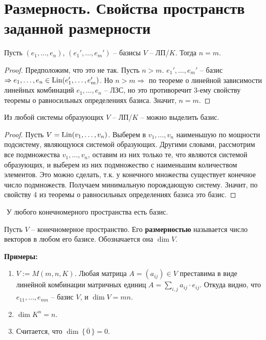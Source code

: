 
\section{Размерность. Свойства пространств заданной размерности}

\begin{theorem-non}
\end{theorem-non}
Пусть $(e_1, \dots, e_n)$, $(e_1', \dots, e_m')$ -- базисы $V$ -- ЛП/$K$.
Тогда $n = m$.
\begin{proof}
    Предположим, что это не так. Пусть $n > m$. $e_1', \dots, e_m'$ --
    базис $\Rightarrow e_1, \dots, e_n \in \operatorname{Lin}(e_1', \dots, e_m')$.
    Но $n > m \Rightarrow$ по теореме о линейной зависимости 
    линейных комбинаций $e_1, \dots, e_n$ -- ЛЗС, но это противоречит
    3-ему свойству теоремы о равносильных определениях базиса. 
    Значит, $n = m$.
\end{proof}

\begin{theorem-non}
\end{theorem-non}
Из любой системы образующих $V$ -- ЛП/$K$ -- можно выделить
базис.
\begin{proof}
    Пусть $V = \operatorname{Lin}(v_1, \dots, v_n)$. Выберем в $v_1, \dots, v_n$
    наименьшую по мощности подсистему, являющуюся системой образующих.
    Другими словами, рассмотрим все подмножества $v_1, \dots, v_n$,
    оставим из них только те, что являются системой образующих, и
    выберем из них подмножество с наименьшим количеством элементов.
    Это можно сделать, т.к. у конечного множества существует конечное 
    число подмножеств. Получаем минимальную порождающую систему.
    Значит, по свойству 4 из теоремы о равносильных определениях базиса
    это базис.
\end{proof}

\follow $ $ У любого конечномерного пространства есть базис.

\begin{conj}
Пусть $V$ -- конечномерное пространство. Его \textbf{размерностью} 
называется число векторов в любом его базисе. Обозначается она $\dim V$.
\end{conj}

\textbf{Примеры:}
\begin{enumerate}
    \item $V := M(m, n, K)$. Любая матрица $A = (a_{ij}) \in V$
    преставима в виде линейной комбинации матричных единиц $A =
    \sum_{i, j} a_{ij} \cdot e_{ij}$. Откуда видно, что
    $e_{11}, \dots, e_{mn}$ -- базис $V$, и $\dim V = mn$.

    \item $\dim K^n = n$.
    
    \item Считается, что $\dim \, \{ \, \overline{0} \, \} = 0$.
\end{enumerate}

